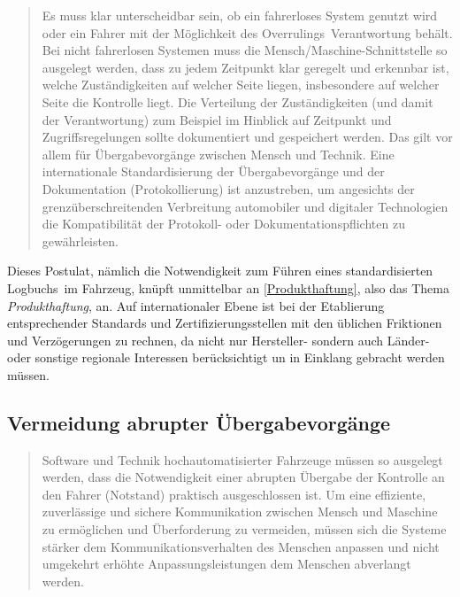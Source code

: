 \documentclass[twoside,a4paper,12pt]{article}
\begin{document}
\begin{quote}
\glqq
Es muss klar unterscheidbar sein, ob ein fahrerloses System genutzt wird oder ein Fahrer
mit der Möglichkeit des \glqq Overrulings\grqq\ Verantwortung behält. Bei nicht fahrerlosen Systemen muss die Mensch/Maschine-Schnittstelle 
so ausgelegt werden, dass zu jedem Zeitpunkt klar geregelt und erkennbar ist, welche Zuständigkeiten auf welcher Seite liegen,
insbesondere auf welcher Seite die Kontrolle liegt. Die Verteilung der Zuständigkeiten
(und damit der Verantwortung) zum Beispiel im Hinblick auf Zeitpunkt und Zugriffsregelungen sollte dokumentiert und gespeichert werden. 
Das gilt vor allem für Übergabevorgänge zwischen Mensch und Technik. Eine internationale Standardisierung der Übergabevorgänge 
und der Dokumentation (Protokollierung) ist anzustreben, um angesichts der
grenzüberschreitenden Verbreitung automobiler und digitaler Technologien die Kompatibilität der Protokoll- oder 
Dokumentationspflichten zu gewährleisten.\grqq\mbox{~\cite[S. 13]{ek}}
\end{quote}

Dieses Postulat, nämlich die Notwendigkeit zum Führen eines standardisierten \glqq Logbuchs\grqq\ im Fahrzeug, knüpft unmittelbar an 
\ref{Produkthaftung}, also das Thema \textit{Produkthaftung}, an. Auf internationaler Ebene ist bei der Etablierung entsprechender Standards 
und Zertifizierungsstellen mit den üblichen Friktionen und Verzögerungen zu rechnen, da nicht nur Hersteller- sondern auch Länder- oder 
sonstige regionale Interessen berücksichtigt un in Einklang gebracht werden müssen.

\subsection{Vermeidung abrupter Übergabevorgänge} \label{VermeidungAbrupterUebergabevorgaenge}

\begin{quote}
\glqq
Software und Technik hochautomatisierter Fahrzeuge müssen so ausgelegt werden, dass
die Notwendigkeit einer abrupten Übergabe der Kontrolle an den Fahrer (\glqq Notstand\grqq)
praktisch ausgeschlossen ist. Um eine effiziente, zuverlässige und sichere Kommunikation zwischen Mensch und Maschine zu 
ermöglichen und Überforderung zu vermeiden,
müssen sich die Systeme stärker dem Kommunikationsverhalten des Menschen anpassen
und nicht umgekehrt erhöhte Anpassungsleistungen dem Menschen abverlangt werden.\grqq\mbox{~\cite[S. 13]{ek}}
\end{quote}
\end{document}
